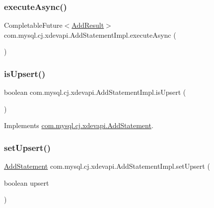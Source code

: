 \subsubsection{\texorpdfstring{execute\+Async()}{executeAsync()}}
{\footnotesize\ttfamily Completable\+Future$<$\mbox{\hyperlink{interfacecom_1_1mysql_1_1cj_1_1xdevapi_1_1_add_result}{Add\+Result}}$>$ com.\+mysql.\+cj.\+xdevapi.\+Add\+Statement\+Impl.\+execute\+Async (\begin{DoxyParamCaption}{ }\end{DoxyParamCaption})}

\mbox{\label{classcom_1_1mysql_1_1cj_1_1xdevapi_1_1_add_statement_impl_ac138d6c3ba88d8d8b1d90703decb0908}} 
\subsubsection{\texorpdfstring{is\+Upsert()}{isUpsert()}}
{\footnotesize\ttfamily boolean com.\+mysql.\+cj.\+xdevapi.\+Add\+Statement\+Impl.\+is\+Upsert (\begin{DoxyParamCaption}{ }\end{DoxyParamCaption})}



Implements \mbox{\hyperlink{interfacecom_1_1mysql_1_1cj_1_1xdevapi_1_1_add_statement_a22f74388f89be049d0f1c591e143874c}{com.\+mysql.\+cj.\+xdevapi.\+Add\+Statement}}.

\mbox{\label{classcom_1_1mysql_1_1cj_1_1xdevapi_1_1_add_statement_impl_a8470fab763b1cfa3555d5dfd7854df2c}} 
\subsubsection{\texorpdfstring{set\+Upsert()}{setUpsert()}}
{\footnotesize\ttfamily \mbox{\hyperlink{interfacecom_1_1mysql_1_1cj_1_1xdevapi_1_1_add_statement}{Add\+Statement}} com.\+mysql.\+cj.\+xdevapi.\+Add\+Statement\+Impl.\+set\+Upsert (\begin{DoxyParamCaption}\item[{boolean}]{upsert }\end{DoxyParamCaption})}



